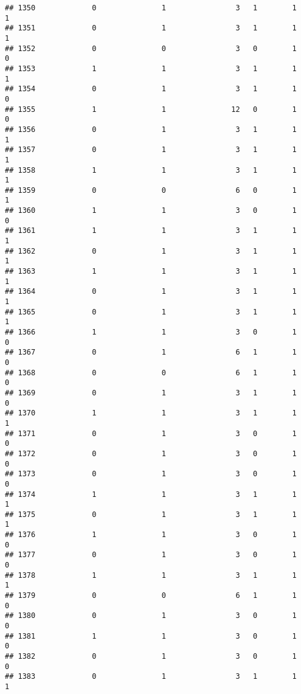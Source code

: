 \documentclass[]{article}
\begin{document}
\begin{verbatim}
## 1350             0               1                3   1        1        1
## 1351             0               1                3   1        1        1
## 1352             0               0                3   0        1        0
## 1353             1               1                3   1        1        1
## 1354             0               1                3   1        1        0
## 1355             1               1               12   0        1        0
## 1356             0               1                3   1        1        1
## 1357             0               1                3   1        1        1
## 1358             1               1                3   1        1        1
## 1359             0               0                6   0        1        1
## 1360             1               1                3   0        1        0
## 1361             1               1                3   1        1        1
## 1362             0               1                3   1        1        1
## 1363             1               1                3   1        1        1
## 1364             0               1                3   1        1        1
## 1365             0               1                3   1        1        1
## 1366             1               1                3   0        1        0
## 1367             0               1                6   1        1        0
## 1368             0               0                6   1        1        0
## 1369             0               1                3   1        1        0
## 1370             1               1                3   1        1        1
## 1371             0               1                3   0        1        0
## 1372             0               1                3   0        1        0
## 1373             0               1                3   0        1        0
## 1374             1               1                3   1        1        1
## 1375             0               1                3   1        1        1
## 1376             1               1                3   0        1        0
## 1377             0               1                3   0        1        0
## 1378             1               1                3   1        1        1
## 1379             0               0                6   1        1        0
## 1380             0               1                3   0        1        0
## 1381             1               1                3   0        1        0
## 1382             0               1                3   0        1        0
## 1383             0               1                3   1        1        1

\end{verbatim}
\end{document}
